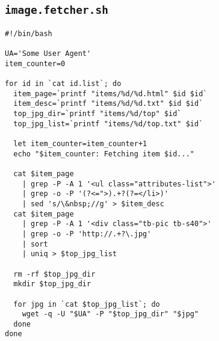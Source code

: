 \subsection{\tt image.fetcher.sh}\label{appsec:image-fetcher}
\begin{verbatim}
#!/bin/bash

UA='Some User Agent'
item_counter=0

for id in `cat id.list`; do
  item_page=`printf "items/%d/%d.html" $id $id`
  item_desc=`printf "items/%d/%d.txt" $id $id`
  top_jpg_dir=`printf "items/%d/top" $id`
  top_jpg_list=`printf "items/%d/top.txt" $id`

  let item_counter=item_counter+1
  echo "$item_counter: Fetching item $id..."

  cat $item_page
    | grep -P -A 1 '<ul class="attributes-list">'
    | grep -o -P '(?<=">).+?(?=</li>)'
    | sed 's/\&nbsp;//g' > $item_desc
  cat $item_page
    | grep -P -A 1 '<div class="tb-pic tb-s40">'
    | grep -o -P 'http://.+?\.jpg'
    | sort
    | uniq > $top_jpg_list

  rm -rf $top_jpg_dir
  mkdir $top_jpg_dir

  for jpg in `cat $top_jpg_list`; do
    wget -q -U "$UA" -P "$top_jpg_dir" "$jpg"
  done
done
\end{verbatim}
